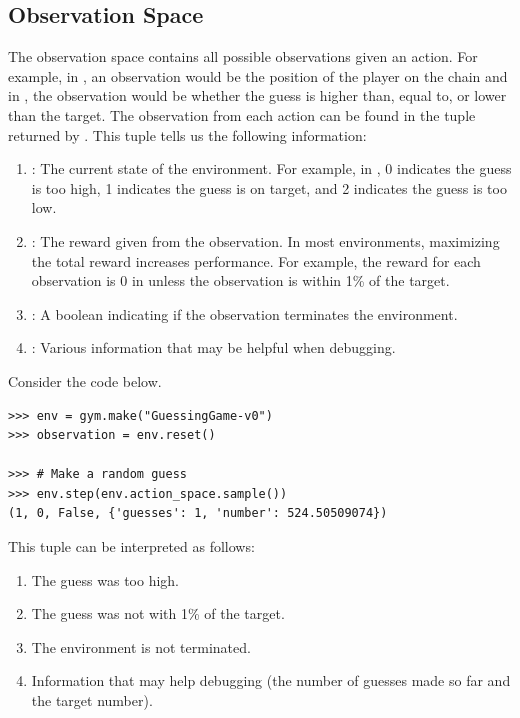 \subsection*{Observation Space}

The observation space contains all possible observations given an action.
For example, in , an observation would be the position of the player on the chain and in , the observation would be whether the guess is higher than, equal to, or lower than the target.
The observation from each action can be found in the tuple returned by .
This tuple tells us the following information:
\begin{enumerate}
\item {}: The current state of the environment. For example, in , 0 indicates the guess is too high, 1 indicates the guess is on target, and 2 indicates the guess is too low.
\item {}: The reward given from the observation. In most environments, maximizing the total reward increases performance. For example, the reward for each observation is 0 in  unless the observation is within 1\% of the target.
\item {}: A boolean indicating if the observation terminates the environment.
\item {}: Various information that may be helpful when debugging.
\end{enumerate}
Consider the code below.

\begin{lstlisting}
>>> env = gym.make("GuessingGame-v0")
>>> observation = env.reset()

>>> # Make a random guess
>>> env.step(env.action_space.sample())
(1, 0, False, {'guesses': 1, 'number': 524.50509074})
\end{lstlisting}
This tuple can be interpreted as follows:
\begin{enumerate}
\item The guess was too high.
\item The guess was not with 1\% of the target.
\item The environment is not terminated.
\item Information that may help debugging (the number of guesses made so far and the target number).
\end{enumerate}

